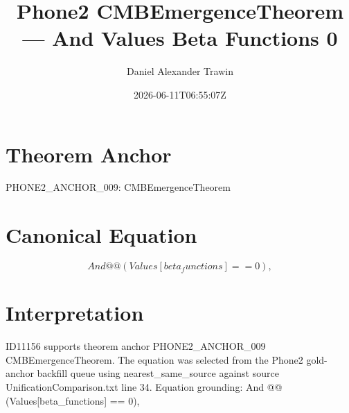 \documentclass[11pt]{article}
\title{Phone2 CMBEmergenceTheorem — And Values Beta Functions 0}
\author{Daniel Alexander Trawin}
\date{2026-06-11T06:55:07Z}
\begin{document}
\maketitle
\section*{Theorem Anchor}
PHONE2_ANCHOR_009: CMBEmergenceTheorem
\section*{Canonical Equation}
\[
And @@ (Values[beta_functions] == 0),
\]
\section*{Interpretation}
ID11156 supports theorem anchor PHONE2_ANCHOR_009 CMBEmergenceTheorem. The equation was selected from the Phone2 gold-anchor backfill queue using nearest_same_source against source UnificationComparison.txt line 34. Equation grounding: And @@ (Values[beta_functions] == 0),
\end{document}
